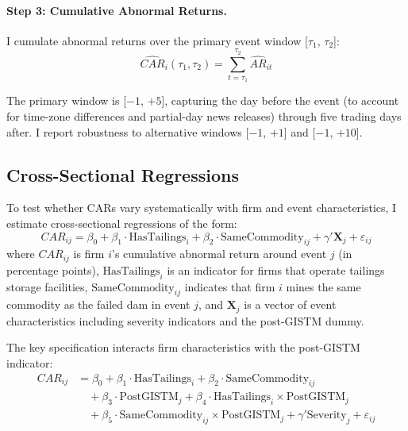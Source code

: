 \documentclass[12pt]{article}
\begin{document}
\paragraph{Step 3: Cumulative Abnormal Returns.} I cumulate abnormal returns over the primary event window [$\tau_1$, $\tau_2$]:
\begin{equation}\label{eq:car}
\widehat{CAR}_i(\tau_1, \tau_2) = \sum_{t=\tau_1}^{\tau_2} \widehat{AR}_{it}
\end{equation}

The primary window is [$-1$, $+5$], capturing the day before the event (to account for time-zone differences and partial-day news releases) through five trading days after. I report robustness to alternative windows [$-1$, $+1$] and [$-1$, $+10$].

\subsection{Cross-Sectional Regressions}

To test whether CARs vary systematically with firm and event characteristics, I estimate cross-sectional regressions of the form:
\begin{equation}\label{eq:cross_section}
CAR_{ij} = \beta_0 + \beta_1 \cdot \text{HasTailings}_i + \beta_2 \cdot \text{SameCommodity}_{ij} + \gamma' \mathbf{X}_j + \varepsilon_{ij}
\end{equation}
where $CAR_{ij}$ is firm $i$'s cumulative abnormal return around event $j$ (in percentage points), $\text{HasTailings}_i$ is an indicator for firms that operate tailings storage facilities, $\text{SameCommodity}_{ij}$ indicates that firm $i$ mines the same commodity as the failed dam in event $j$, and $\mathbf{X}_j$ is a vector of event characteristics including severity indicators and the post-GISTM dummy.

The key specification interacts firm characteristics with the post-GISTM indicator:
\begin{align}\label{eq:gistm_interaction}
CAR_{ij} &= \beta_0 + \beta_1 \cdot \text{HasTailings}_i + \beta_2 \cdot \text{SameCommodity}_{ij} \nonumber \\
&\quad + \beta_3 \cdot \text{PostGISTM}_j + \beta_4 \cdot \text{HasTailings}_i \times \text{PostGISTM}_j \nonumber \\
&\quad + \beta_5 \cdot \text{SameCommodity}_{ij} \times \text{PostGISTM}_j + \gamma' \text{Severity}_j + \varepsilon_{ij}
\end{align}
\end{document}

